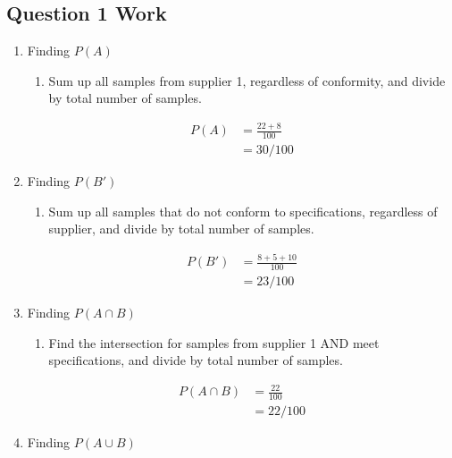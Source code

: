 \documentclass[../INDE315_HW.tex]{subfiles}
\begin{document}
\subsection*{Question 1 Work}
\begin{enumerate}
    \item Finding $P(A)$
        \begin{enumerate}
            \item Sum up all samples from supplier 1, regardless of conformity, and divide by total number of samples.
        \end{enumerate}
        \begin{equation*}
            \begin{aligned}
                P(A) &= \frac{22+8}{100} \\
                     &= 30/100
            \end{aligned}
        \end{equation*}
    \item Finding $P(B')$
        \begin{enumerate}
            \item Sum up all samples that do not conform to specifications, regardless of supplier, and divide by total number of samples.
        \end{enumerate}
        \begin{equation*}
            \begin{aligned}
                P(B') &= \frac{8 + 5 + 10}{100} \\
                     &= 23/100
            \end{aligned}
        \end{equation*}
    \item Finding $P(A \cap B)$
        \begin{enumerate}
            \item Find the intersection for samples from supplier 1 AND meet specifications, and divide by total number of samples.
        \end{enumerate}
        \begin{equation*}
            \begin{aligned}
                P(A \cap B) &= \frac{22}{100} \\
                     &= 22/100
            \end{aligned}
        \end{equation*}
    \item Finding $P(A \cup B)$
        \begin{enumerate}

\end{enumerate}
\end{enumerate}
\end{document}
